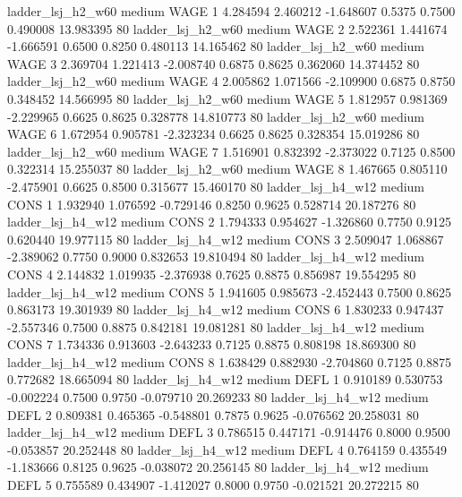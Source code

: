      ladder_lsj_h2_w60     medium     WAGE                 1  4.284594 2.460212 -1.648607 0.5375 0.7500  0.490008   13.983395 80
     ladder_lsj_h2_w60     medium     WAGE                 2  2.522361 1.441674 -1.666591 0.6500 0.8250  0.480113   14.165462 80
     ladder_lsj_h2_w60     medium     WAGE                 3  2.369704 1.221413 -2.008740 0.6875 0.8625  0.362060   14.374452 80
     ladder_lsj_h2_w60     medium     WAGE                 4  2.005862 1.071566 -2.109900 0.6875 0.8750  0.348452   14.566995 80
     ladder_lsj_h2_w60     medium     WAGE                 5  1.812957 0.981369 -2.229965 0.6625 0.8625  0.328778   14.810773 80
     ladder_lsj_h2_w60     medium     WAGE                 6  1.672954 0.905781 -2.323234 0.6625 0.8625  0.328354   15.019286 80
     ladder_lsj_h2_w60     medium     WAGE                 7  1.516901 0.832392 -2.373022 0.7125 0.8500  0.322314   15.255037 80
     ladder_lsj_h2_w60     medium     WAGE                 8  1.467665 0.805110 -2.475901 0.6625 0.8500  0.315677   15.460170 80
     ladder_lsj_h4_w12     medium     CONS                 1  1.932940 1.076592 -0.729146 0.8250 0.9625  0.528714   20.187276 80
     ladder_lsj_h4_w12     medium     CONS                 2  1.794333 0.954627 -1.326860 0.7750 0.9125  0.620440   19.977115 80
     ladder_lsj_h4_w12     medium     CONS                 3  2.509047 1.068867 -2.389062 0.7750 0.9000  0.832653   19.810494 80
     ladder_lsj_h4_w12     medium     CONS                 4  2.144832 1.019935 -2.376938 0.7625 0.8875  0.856987   19.554295 80
     ladder_lsj_h4_w12     medium     CONS                 5  1.941605 0.985673 -2.452443 0.7500 0.8625  0.863173   19.301939 80
     ladder_lsj_h4_w12     medium     CONS                 6  1.830233 0.947437 -2.557346 0.7500 0.8875  0.842181   19.081281 80
     ladder_lsj_h4_w12     medium     CONS                 7  1.734336 0.913603 -2.643233 0.7125 0.8875  0.808198   18.869300 80
     ladder_lsj_h4_w12     medium     CONS                 8  1.638429 0.882930 -2.704860 0.7125 0.8875  0.772682   18.665094 80
     ladder_lsj_h4_w12     medium     DEFL                 1  0.910189 0.530753 -0.002224 0.7500 0.9750 -0.079710   20.269233 80
     ladder_lsj_h4_w12     medium     DEFL                 2  0.809381 0.465365 -0.548801 0.7875 0.9625 -0.076562   20.258031 80
     ladder_lsj_h4_w12     medium     DEFL                 3  0.786515 0.447171 -0.914476 0.8000 0.9500 -0.053857   20.252448 80
     ladder_lsj_h4_w12     medium     DEFL                 4  0.764159 0.435549 -1.183666 0.8125 0.9625 -0.038072   20.256145 80
     ladder_lsj_h4_w12     medium     DEFL                 5  0.755589 0.434907 -1.412027 0.8000 0.9750 -0.021521   20.272215 80
